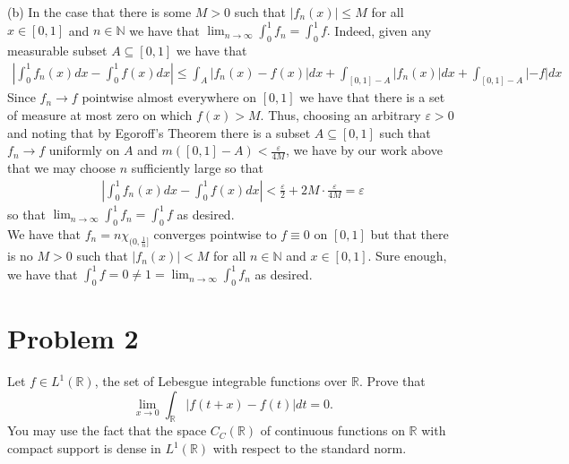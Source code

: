 \documentclass{article}
\begin{document}
\noindent (b) In the case that there is some $M>0$ such that $|f_n(x)|\leq M$ for all $x\in[0,1]$ and $n\in\mathbb{N}$ we have that $\lim_{n\rightarrow\infty}\int_0^1f_n=\int_0^1f.$ Indeed, given any measurable subset $A\subseteq [0,1]$ we have that
\begin{align*}
\left|\int_0^1f_n(x)dx-\int_0^1f(x)dx\right|\leq\int_A|f_n(x)-f(x)|dx+\int_{[0,1]-A}|f_n(x)|dx+\int_{[0,1]-A}|-f|dx
\end{align*}
Since $f_n\rightarrow f$ pointwise almost everywhere on $[0,1]$ we have that there is a set of measure at most zero on which $f(x)>M$.  Thus, choosing an arbitrary $\varepsilon>0$ and noting that by Egoroff's Theorem there is a subset $A\subseteq[0,1]$ such that $f_n\rightarrow f$ uniformly on $A$ and $m([0,1]-A)<\frac{\varepsilon}{4M}$, we have by our work above that we may choose $n$ sufficiently large so that 
\begin{align*}
\left|\int_0^1f_n(x)dx-\int_0^1f(x)dx\right|<\frac{\varepsilon}{2}+2M\cdot\frac{\varepsilon}{4M}=\varepsilon
\end{align*}
so that $\lim_{n\rightarrow\infty}\int_0^1f_n=\int_0^1f$ as desired.\\

\noindent We have that $f_n=n\chi_{(0,\frac{1}{n}]}$ converges pointwise to $f\equiv0$ on $[0,1]$ but that there is no $M>0$ such that $|f_n(x)|<M$ for all $n\in\mathbb{N}$ and $x\in[0,1]$.  Sure enough, we have that $\int_0^1f=0\neq 1=\lim_{n\rightarrow\infty}\int_0^1f_n$ as desired.

\section*{Problem 2}
Let $f\in L^1(\mathbb{R})$, the set of Lebesgue integrable functions over $\mathbb{R}$.  Prove that $$\lim_{x\rightarrow0}\int_\mathbb{R}|f(t+x)-f(t)|dt=0.$$ You may use the fact that the space $C_C(\mathbb{R})$ of continuous functions on $\mathbb{R}$ with compact support is dense in $L^1(\mathbb{R})$ with respect to the standard norm.
\end{document}
